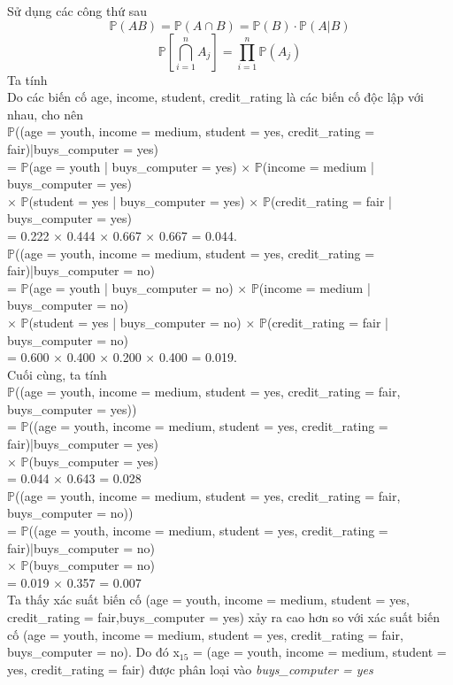 \documentclass[a4paper, 13pt]{report}
\begin{document}
Sử dụng các công thứ sau
\[
\mathbb{P}(AB)=\mathbb{P}(A\cap B)=\mathbb{P}(B)\cdot\mathbb{P}(A|B)
\]
\[
\mathbb{P}\left[\bigcap_{i=1}^n A_j \right]=\prod_{i=1}^n \mathbb{P}(A_j)
\]
Ta tính\\
Do các biến cố age, income, student, credit\_rating là các biến cố độc lập với nhau, cho nên\\
$\mathbb{P}$((age = youth, income = medium, student = yes, credit\_rating = fair)|buys\_computer = yes) \\
= $\mathbb{P}$(age = youth | buys\_computer = yes) $\times$ $\mathbb{P}$(income = medium | buys\_computer = yes)\\
$\times$ $\mathbb{P}$(student = yes | buys\_computer = yes) $\times$ $\mathbb{P}$(credit\_rating = fair | buys\_computer = yes)\\
= 0.222 $\times$ 0.444 $\times$ 0.667 $\times$ 0.667 = 0.044.\\
$\mathbb{P}$((age = youth, income = medium, student = yes, credit\_rating = fair)|buys\_computer = no) \\
= $\mathbb{P}$(age = youth | buys\_computer = no) $\times$ $\mathbb{P}$(income = medium | buys\_computer = no)\\
$\times$ $\mathbb{P}$(student = yes | buys\_computer = no) $\times$ $\mathbb{P}$(credit\_rating = fair | buys\_computer = no)\\
= 0.600 $\times$ 0.400 $\times$ 0.200 $\times$ 0.400 = 0.019.\\
Cuối cùng, ta tính\\
$\mathbb{P}$((age = youth, income = medium, student = yes, credit\_rating = fair, buys\_computer = yes))\\
= $\mathbb{P}$((age = youth, income = medium, student = yes, credit\_rating = fair)|buys\_computer = yes) \\
$\times$ $\mathbb{P}$(buys\_computer = yes)\\
= 0.044 $\times$ 0.643 = 0.028\\
$\mathbb{P}$((age = youth, income = medium, student = yes, credit\_rating = fair, buys\_computer = no)) \\
= $\mathbb{P}$((age = youth, income = medium, student = yes, credit\_rating = fair)|buys\_computer = no) \\
$\times$ $\mathbb{P}$(buys\_computer = no)\\
= 0.019 $\times$ 0.357 = 0.007\\
Ta thấy xác suất biến cố (age = youth, income = medium, student = yes, credit\_rating = fair,buys\_computer = yes) xảy ra cao hơn so với xác suất biến cố (age = youth, income = medium, student = yes, credit\_rating = fair, buys\_computer = no). Do đó x$_{15}$ = (age = youth, income = medium, student = yes, credit\_rating = fair) được phân loại vào \textit{buys\_computer = yes}\\
\end{document}
